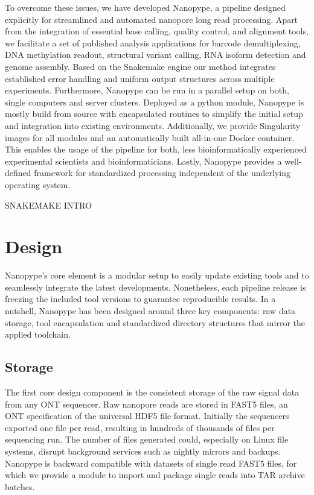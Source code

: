 To overcome these issues, we have developed Nanopype, a pipeline designed explicitly for streamlined and automated nanopore long read processing. Apart from the integration of essential base calling, quality control, and alignment tools, we facilitate a set of published analysis applications for barcode demultiplexing, DNA methylation readout, structural variant calling, RNA isoform detection and genome assembly. 
Based on the Snakemake engine \cite{Koester2012} our method integrates established error handling and uniform output structures across multiple experiments. Furthermore, Nanopype can be run in a parallel setup on both, single computers and server clusters. Deployed as a python module, Nanopype is mostly build from source with encapsulated routines to simplify the initial setup and integration into existing environments. Additionally, we provide Singularity images for all modules and an automatically built all-in-one Docker container. This enables the usage of the pipeline for both, less bioinformatically experienced experimental scientists and bioinformaticians. Lastly, Nanopype provides a well-defined framework for standardized processing independent of the underlying operating system.


SNAKEMAKE INTRO

\section{Design}
\label{sec:nanopype:design}
Nanopype’s core element is a modular setup to easily update existing tools and to seamlessly integrate the latest developments. Nonetheless, each pipeline release is freezing the included tool versions to guarantee reproducible results. In a nutshell, Nanopype has been designed around three key components: raw data storage, tool encapsulation and standardized directory structures that mirror the applied toolchain.

\subsection{Storage}
\label{subsec:nanopype:storage}
The first core design component is the consistent storage of the raw signal data from any ONT sequencer. 
Raw nanopore reads are stored in FAST5 files, an ONT specification of the universal HDF5 file format. Initially the sequencers exported one file per read, resulting in hundreds of thousands of files per sequencing run. 
The number of files generated could, especially on Linux file systems, disrupt background services such as nightly mirrors and backups.
Nanopype is backward compatible with datasets of single read FAST5 files, for which we provide a module to import and package single reads into TAR archive batches.

